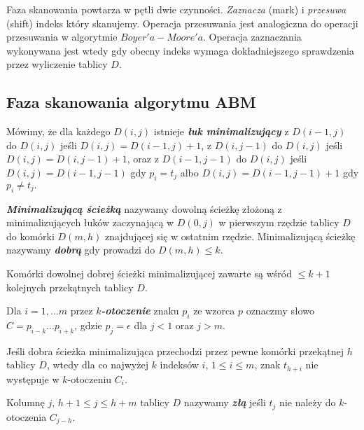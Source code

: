 Faza skanowania powtarza w pętli dwie czynności. \textit{Zaznacza} (mark) i \textit{przesuwa} (shift) indeks który skanujemy. Operacja przesuwania jest analogiczna do operacji przesuwania w algorytmie $Boyer'a-Moore'a$. Operacja zaznaczania wykonywana jest wtedy gdy obecny indeks wymaga dokładniejszego sprawdzenia przez wyliczenie tablicy $D.$

\subsection{Faza skanowania algorytmu ABM}
\begin{definition}{}{}
    Mówimy, że dla każdego $D(i,j)$ istnieje {\bf \textit{łuk minimalizujący}} z $D(i-1, j)$ do $D(i, j)$ jeśli $D(i,j) = D(i - 1, j)+1$, z $D(i, j-1)$ do $D(i, j)$ jeśli $D(i,j) = D(i, j-1)+1$, oraz z $D(i-1,j-1)$ do $D(i, j)$ jeśli $D(i,j) = D(i-1, j-1)$ gdy $p_i = t_j$ albo 
    $D(i,j) = D(i-1, j-1) + 1$ gdy $p_i \neq t_j.$
\end{definition}
\begin{definition}{}{}
    {\bf \textit{Minimalizującą ścieżką}} nazywamy dowolną ścieżkę złożoną z minimalizujących łuków zaczynającą w $D(0,j)$ w pierwszym rzędzie tablicy $D$ do komórki $D(m, h)$ znajdującej się w ostatnim rzędzie. Minimalizującą ścieżkę nazywamy {\bf \textit{dobrą}} gdy prowadzi do $D(m, h) \leq k.$
\end{definition}
\begin{lemma}{}{}
    Komórki dowolnej dobrej ścieżki minimalizującej zawarte są wśród $\leq k+1$ kolejnych przekątnych tablicy $D.$
\end{lemma}
\begin{definition}{}{}
    Dla $i = 1,...m$ przez {\bf \textit{$k$-otoczenie}} znaku $p_i$ ze wzorca $p$ oznaczmy słowo $C = p_{i-k}...p_{i+k}$, gdzie $p_j = \epsilon$ dla $j < 1$ oraz $j > m.$
\end{definition}
\begin{lemma}{}{}
   Jeśli dobra ścieżka minimalizująca przechodzi przez pewne komórki przekątnej $h$ tablicy $D$, wtedy dla co najwyżej $k$ indeksów $i$, $1 \leq i \leq m$, znak $t_{h+i}$ nie występuje w $k$-otoczeniu $C_i.$
\end{lemma}

\begin{definition}{}{}
    Kolumnę $j$, $h+1 \leq j \leq h+m$ tablicy $D$ nazywamy {\bf \textit{złą}} jeśli $t_j$ nie należy do $k$-otoczenia $C_{j-h}.$
\end{definition}

